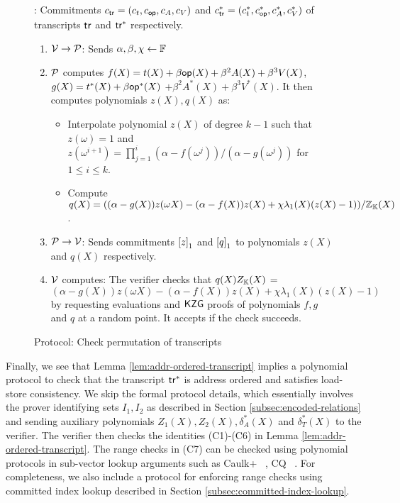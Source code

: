 \begin{figure}[htbp]
    \centering
    \begin{mdframed}
    {\footnotesize
    : Commitments $c_{\mathsf{tr}}=(c_t,c_{\mathsf{op}},c_A, c_V)$ and $c_{\mathsf{tr}}^\ast=(c_t^\ast,c_{\mathsf{op}}^\ast, c_A^\ast, c_V^\ast)$
        of transcripts $\mathsf{tr}$ and $\mathsf{tr}^\ast$ respectively.
        \begin{enumerate}[leftmargin=2em]
            \item $\mathcal{V}\rightarrow\mathcal{P}$: Sends $\alpha,\beta, \chi\gets \mathbb{F}$
            \item $\mathcal{P}$ computes $f(X)=t(X) + \beta \mathsf{op}(X) + \beta^2 A(X) + \beta^3 V(X)$, $g(X) = t^\ast(X) + \beta \mathsf{op}^\ast(X)$
            $+ \beta^2 A^\ast(X) + \beta^3 V^\ast(X)$. It then computes polynomials $z(X),q(X)$ as:
            \begin{itemize}[leftmargin=1em]
                \item Interpolate polynomial $z(X)$ of degree $k-1$ such that $z(\omega)=1$ and
                $z(\omega^{i+1})=\prod_{j=1}^i (\alpha - f(\omega^j))/(\alpha - g(\omega^j))$ for $1\leq i\leq k$.
                \item Compute $q(X) = ((\alpha - g(X))z(\omega X) - (\alpha - f(X))z(X) + \chi\lambda_1(X)(z(X) - 1))/\mathbb{Z}_{\mathbb{K}}(X)$.
            \end{itemize}
            \item $\mathcal{P}\rightarrow\mathcal{V}$: Sends commitments $\left[{z}\right]_1$ and $\left[{q}\right]_1$ to polynomials $z(X)$ and $q(X)$ respectively.
            \item $\mathcal{V}$ computes: The verifier checks that $q(X)Z_{\mathbb{K}}(X)$ = $(\alpha - g(X))z(\omega X)-(\alpha - f(X))z(X) + \chi\lambda_1(X)(z(X) - 1)$
            by requesting evaluations and $\mathsf{KZG}$ proofs of polynomials $f,g$ and $q$ at a random point. It accepts if the check succeeds.
        \end{enumerate}
    }
    \end{mdframed}
    \vspace*{-5mm}
    \caption{Protocol: Check permutation of transcripts}
    \label{fig:permutated-transcripts}
\end{figure}
Finally, we see that Lemma \ref{lem:addr-ordered-transcript} implies a polynomial protocol to check that the transcript
$\mathsf{tr}^\ast$ is address ordered and satisfies load-store consistency. We skip the formal protocol details, which
essentially involves the prover identifying sets
$I_1, I_2$ as described in Section \ref{subsec:encoded-relations} and sending auxiliary polynomials $Z_1(X),Z_2(X),\delta^\ast_A(X)$ and $\delta^\ast_T(X)$ to the verifier.
The verifier then checks the identities (C1)-(C6) in Lemma \ref{lem:addr-ordered-transcript}.
The range checks in (C7) can be checked using polynomial protocols in sub-vector lookup arguments such as Caulk+ ~\cite{EPRINT:PosKat22}, CQ
~\cite{EPRINT:EagFioGab22}. For completeness, we also include a protocol for enforcing range checks using committed index lookup
described in Section \ref{subsec:committed-index-lookup}.


